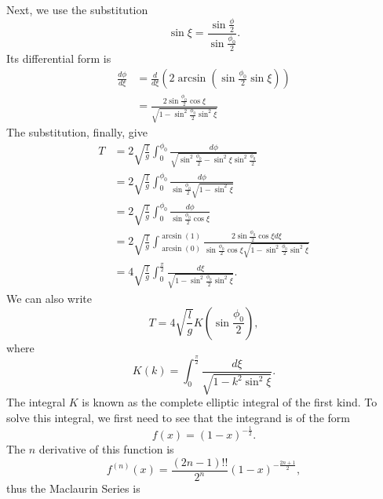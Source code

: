 \begin{problem}[title={Pendulum period as a function of amplitude}]
{\begin{equation*}
\end{equation*}
Next, we use the substitution
\begin{equation*}
    \sin{\xi} = \frac{\sin{\frac{\phi}{2}}}{\sin{\frac{\phi_0}{2}}}.
\end{equation*}
Its differential form is
\begin{align*}
    \frac{d\phi}{d\xi} &= \frac{d}{d\xi} \left( 2 \arcsin{\left(\sin{\frac{\phi_0}{2}}\sin{\xi}\right)} \right) \\
    &= \frac{2\sin{\frac{\phi_0}{2}}\cos{\xi}}{\sqrt{1-\sin^2{\frac{\phi_0}{2}}\sin^2{\xi}}}
\end{align*}
The substitution, finally, give
\begin{align*}
    T &= 2\sqrt{\frac{l}{g}} \int_{0}^{\phi_0} \frac{d\phi}{\sqrt{\sin^2{\frac{\phi_0}{2}} - \sin^2{\xi}\sin^2{\frac{\phi_0}{2}}}} \\
    &= 2\sqrt{\frac{l}{g}} \int_{0}^{\phi_0} \frac{d\phi}{\sin{\frac{\phi_0}{2}}\sqrt{ 1 - \sin^2{\xi}}} \\
    &= 2\sqrt{\frac{l}{g}} \int_{0}^{\phi_0} \frac{d\phi}{\sin{\frac{\phi_0}{2}}\cos{\xi}} \\
    &= 2\sqrt{\frac{l}{g}} \int_{\arcsin{(0)}}^{\arcsin{(1)}} \frac{2\sin{\frac{\phi_0}{2}}\cos{\xi} d\xi}{\sin{\frac{\phi_0}{2}}\cos{\xi}\sqrt{1-\sin^2{\frac{\phi_0}{2}}\sin^2{\xi}}} \\
    &= 4\sqrt{\frac{l}{g}} \int_{0}^{\frac{\pi}{2}} \frac{d\xi}{\sqrt{1-\sin^2{\frac{\phi_0}{2}}\sin^2{\xi}}}.
\end{align*}
We can also write
\begin{equation*}
    T = 4\sqrt{\frac{l}{g}} K\left(\sin{\frac{\phi_0}{2}}\right),
\end{equation*}
where 
\begin{equation} \label{S11P1_K}
    K(k) = \int_{0}^{\frac{\pi}{2}} \frac{d\xi}{\sqrt{1-k^2\sin^2{\xi}}}.
\end{equation}
The integral $K$ is known as the complete elliptic integral of the first kind. To solve this integral, we first need to see that the integrand is of the form 
\begin{equation*}
    f(x) = \left( 1 - x \right)^{-\frac{1}{2}}.
\end{equation*}
The $n$ derivative of this function is
\begin{equation*}
    f^{(n)}(x) = \frac{\left( 2n-1 \right)!!}{2^n}\left( 1-x \right)^{-\frac{2n+1}{2}},
\end{equation*}
thus the Maclaurin Series is
\begin{equation*}

\end{equation*}}
\end{problem}
